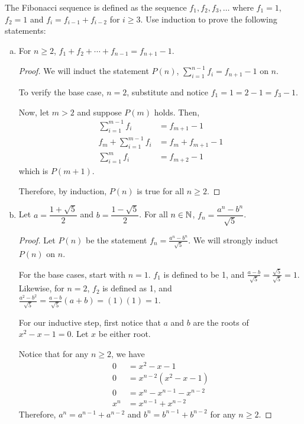 \documentclass{agony}
\begin{document}
\question The Fibonacci sequence is defined as the sequence $f_1, f_2, f_3, \dots$
where $f_1=1$, $f_2=1$ and $f_i=f_{i-1}+f_{i-2}$ for $i \geq 3$.
Use induction to prove the following statements:
\begin{enumerate}[(a)]
  \item For $n \geq 2$, $f_1 + f_2 + \cdots + f_{n-1} = f_{n+1} - 1$.
        \begin{proof}
          We will induct the statement $P(n)$, $\sum_{i=1}^{n-1} f_i = f_{n+1}-1$ on $n$.

          To verify the base case, $n = 2$, substitute and notice $f_1 = 1 = 2-1 = f_3-1$.

          Now, let $m > 2$ and suppose $P(m)$ holds. Then,
          \begin{align*}
            \sum_{i=1}^{m-1} f_i       & = f_{m+1}-1         \\
            f_m + \sum_{i=1}^{m-1} f_i & = f_m + f_{m+1} - 1 \\
            \sum_{i=1}^{m} f_i         & = f_{m+2}-1
          \end{align*}
          which is $P(m+1)$.

          Therefore, by induction, $P(n)$ is true for all $n \geq 2$.
        \end{proof}
  \item Let $a = \dfrac{1+\sqrt{5}}{2}$ and $b = \dfrac{1-\sqrt{5}}{2}$.
        For all $n\in\mathbb{N}$, $f_n = \dfrac{a^n-b^n}{\sqrt{5}}$.
        \begin{proof}
          Let $P(n)$ be the statement $f_n = \frac{a^n-b^n}{\sqrt{5}}$.
          We will strongly induct $P(n)$ on $n$.

          For the base cases, start with $n=1$.
          $f_1$ is defined to be 1, and $\frac{a-b}{\sqrt{5}} = \frac{\sqrt{5}}{\sqrt{5}} = 1$.
          Likewise, for $n=2$, $f_2$ is defined as 1, and
          $\frac{a^2-b^2}{\sqrt{5}}=\frac{a-b}{\sqrt{5}}(a+b)=(1)(1)=1$.

          For our inductive step, first notice that $a$ and $b$ are the roots of $x^2-x-1=0$.
          Let $x$ be either root.

          Notice that for any $n \geq 2$, we have
          \begin{align*}
            0   & = x^2-x-1                 \\
            0   & = x^{n-2}(x^2-x-1)        \\
            0   & = x^n - x^{n-1} - x^{n-2} \\
            x^n & = x^{n-1} + x^{n-2}
          \end{align*}
          Therefore, $a^n = a^{n-1}+a^{n-2}$ and $b^n = b^{n-1}+b^{n-2}$ for any $n \geq 2$.


\end{proof}
\end{enumerate}
\end{document}
